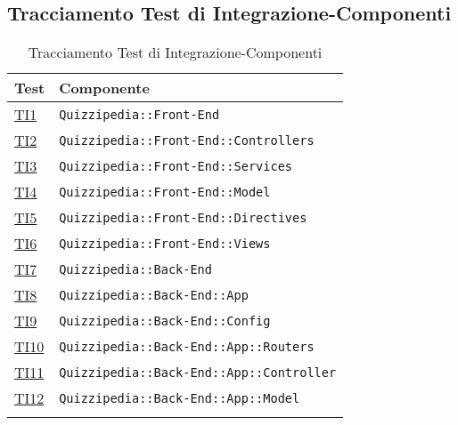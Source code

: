 \subsection{Tracciamento Test di Integrazione-Componenti}
\normalsize
\begin{longtable}[ht]{|>{\centering}m{3cm}|m{10cm}<{\centering}|}
\hline 
\textbf{Test} & \textbf{Componente}\\
\hline
\endhead
\hyperlink{TI1}{TI1} & {\texttt{Quizzipedia::Front-End}}\\ \hline
\hyperlink{TI2}{TI2} & {\texttt{Quizzipedia::Front-End::Controllers}}\\ \hline
\hyperlink{TI3}{TI3} & {\texttt{Quizzipedia::Front-End::Services}}\\ \hline
\hyperlink{TI4}{TI4} & {\texttt{Quizzipedia::Front-End::Model}}\\ \hline
\hyperlink{TI5}{TI5} & {\texttt{Quizzipedia::Front-End::Directives}}\\ \hline
\hyperlink{TI6}{TI6} & {\texttt{Quizzipedia::Front-End::Views}}\\ \hline
\hyperlink{TI7}{TI7} & {\texttt{Quizzipedia::Back-End}}\\ \hline
\hyperlink{TI8}{TI8} & {\texttt{Quizzipedia::Back-End::App}}\\ \hline
\hyperlink{TI9}{TI9} & {\texttt{Quizzipedia::Back-End::Config}}\\ \hline
\hyperlink{TI10}{TI10} & {\texttt{Quizzipedia::Back-End::App::Routers}}\\ \hline
\hyperlink{TI11}{TI11} & {\texttt{Quizzipedia::Back-End::App::Controller}}\\ \hline
\hyperlink{TI12}{TI12} & {\texttt{Quizzipedia::Back-End::App::Model}}\\ \hline
\caption[Tracciamento Test di Integrazione-Componenti]{Tracciamento Test di Integrazione-Componenti}
\label{tabella:ts-requi}
\end{longtable}
\clearpage

